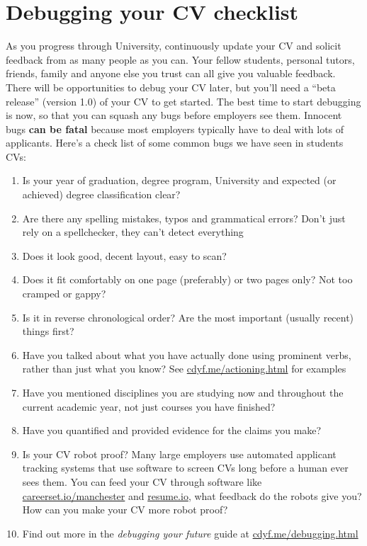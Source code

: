 \documentclass[
]{book}
\providecommand{\tightlist}{%
  \setlength{\itemsep}{0pt}\setlength{\parskip}{0pt}}
\begin{document}
\hypertarget{debugging-your-cv-checklist}{%
\section{Debugging your CV checklist}\label{debugging-your-cv-checklist}}

As you progress through University, continuously update your CV and solicit feedback from as many people as you can. Your fellow students, personal tutors, friends, family and anyone else you trust can all give you valuable feedback. There will be opportunities to debug your CV later, but you'll need a ``beta release'' (version 1.0) of your CV to get started. The best time to start debugging is now, so that you can squash any bugs before employers see them. Innocent bugs \textbf{can be fatal} because most employers typically have to deal with lots of applicants. Here's a check list of some common bugs we have seen in students CVs:

\begin{enumerate}
\def\labelenumi{\arabic{enumi}.}
\tightlist
\item
  Is your year of graduation, degree program, University and expected (or achieved) degree classification clear?
\item
  Are there any spelling mistakes, typos and grammatical errors? Don't just rely on a spellchecker, they can't detect everything
\item
  Does it look good, decent layout, easy to scan?
\item
  Does it fit comfortably on one page (preferably) or two pages only? Not too cramped or gappy?
\item
  Is it in reverse chronological order? Are the most important (usually recent) things first?
\item
  Have you talked about what you have actually done using prominent verbs, rather than just what you know? See \href{https://www.cdyf.me/actioning.html}{cdyf.me/actioning.html} for examples
\item
  Have you mentioned disciplines you are studying now and throughout the current academic year, not just courses you have finished?
\item
  Have you quantified and provided evidence for the claims you make?
\item
  Is your CV robot proof? Many large employers use automated applicant tracking systems that use software to screen CVs long before a human ever sees them. You can feed your CV through software like \href{http://careerset.io/manchester}{careerset.io/manchester} and \href{https://resume.io/}{resume.io}, what feedback do the robots give you? How can you make your CV more robot proof?
\item
  Find out more in the \emph{debugging your future} \citep{debugyourfuture} guide at \href{https://www.cdyf.me/debugging.html}{cdyf.me/debugging.html}
\end{enumerate}
\end{document}

